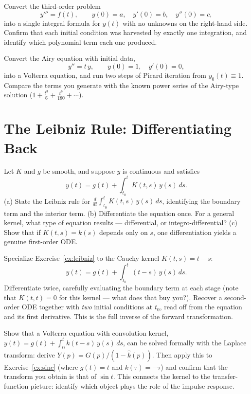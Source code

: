 \documentclass{essay}
\begin{document}
\begin{exercise}\label{ex:thirdorder}
  Convert the third-order problem
  \[
    y''' = f(t), \qquad y(0) = a, \quad y'(0) = b, \quad y''(0) = c,
  \]
  into a single integral formula for $y(t)$ with no unknowns on the right-hand side. Confirm that each initial condition was harvested by exactly one integration, and identify which polynomial term each one produced.
\end{exercise}

\begin{exercise}\label{ex:airy}
  Convert the Airy equation with initial data,
  \[
    y'' = t\,y, \qquad y(0) = 1, \quad y'(0) = 0,
  \]
  into a Volterra equation, and run two steps of Picard iteration from $y_0(t) \equiv 1$. Compare the terms you generate with the known power series of the Airy-type solution ($1 + \tfrac{t^3}{6} + \tfrac{t^6}{180} + \cdots$).
\end{exercise}

\section{The Leibniz Rule: Differentiating Back}

\begin{exercise}\label{ex:leibniz}
  Let $K$ and $g$ be smooth, and suppose $y$ is continuous and satisfies
  \[
    y(t) = g(t) + \int_{t_0}^{t} K(t, s)\, y(s)\, ds.
  \]
  (a) State the Leibniz rule for $\frac{d}{dt}\int_{t_0}^{t} K(t,s)\,y(s)\,ds$, identifying the boundary term and the interior term. (b) Differentiate the equation once. For a general kernel, what type of equation results --- differential, or integro-differential? (c) Show that if $K(t,s) = k(s)$ depends only on $s$, one differentiation yields a genuine first-order ODE.
\end{exercise}

\begin{exercise}\label{ex:twoderivs}
  Specialize Exercise~\ref{ex:leibniz} to the Cauchy kernel $K(t,s) = t - s$:
  \[
    y(t) = g(t) + \int_{t_0}^{t} (t - s)\, y(s)\, ds.
  \]
  Differentiate twice, carefully evaluating the boundary term at each stage (note that $K(t,t) = 0$ for this kernel --- what does that buy you?). Recover a second-order ODE together with \emph{two} initial conditions at $t_0$, read off from the equation and its first derivative. This is the full inverse of the forward transformation.
\end{exercise}

\begin{exercise}\label{ex:convolution}
  Show that a Volterra equation with convolution kernel, $y(t) = g(t) + \int_0^t k(t-s)\,y(s)\,ds$, can be solved formally with the Laplace transform: derive $Y(p) = G(p)/(1 - \widehat{k}(p))$. Then apply this to Exercise~\ref{ex:sine} (where $g(t) = t$ and $k(\tau) = -\tau$) and confirm that the transform you obtain is that of $\sin t$. This connects the kernel to the transfer-function picture: identify which object plays the role of the impulse response.
\end{exercise}
\end{document}
